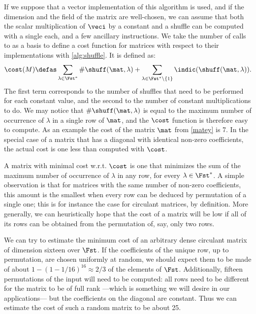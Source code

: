If we suppose that a vector implementation of this algorithm is used, and if the dimension and the field of the matrix are well-chosen,
we can assume that both the scalar multiplication of $\veci$ by a constant and a shuffle can be computed with a single
\pshufb{} each, and a few ancillary instructions. We take the number of calls to \pshufb as a basis to define a cost function for matrices with respect to their implementations with \autoref{alg:shuffle}.
It is defined as:
\[
\cost(M) \defas \sum_{\lambda \in \Fst^*}\#\shuff(\mat, \lambda) + \sum_{\lambda \in \Fst^*\setminus\{1\}}\indic(\shuff(\mat, \lambda)).
\]
The first term corresponds to the number of shuffles that need to be performed for each constant value, and the second to the number
of constant multiplications to do.
We may notice that $\#\shuff(\mat, \lambda)$ is equal to the maximum number of occurrence of $\lambda$ in a single row of $\mat$, and the $\cost$ function
is therefore easy to compute. As an example the cost of the matrix $\mat$ from \autoref{matey} is 7. In the special case of a matrix that has a diagonal
with identical non-zero coefficients, the actual cost is one less than computed with $\cost$.

\medskip

A matrix with minimal cost w.r.t. $\cost$ is one that
minimizes the sum of the maximum number of occurrence of $\lambda$ in any row, for every $\lambda \in \Fst^*$.
A simple observation is that for matrices with the same number of non-zero coefficients, this amount is the smallest when every row can be deduced by permutation of a single one;
this is for instance the case for circulant matrices, by definition.
More generally, we can heuristically hope that the cost of a matrix will be low if all of its rows can be obtained from the permutation of, say, only two rows.

We can try to estimate the minimum cost of an arbitrary dense circulant matrix of dimension sixteen over $\Fst$.
If the coefficients of the unique row, up to permutation, are chosen uniformly at random, we should expect them to be made of about $1-(1-1/16)^{16} \approx 2/3$ of the elements of $\Fst$.
Additionally, fifteen permutations of the input will need to be computed: all rows need to be different for the matrix to be of full rank ---which is something we will
desire in our applications--- but the coefficients on the diagonal are constant.
Thus we can estimate the cost of such a random matrix to be about 25.


